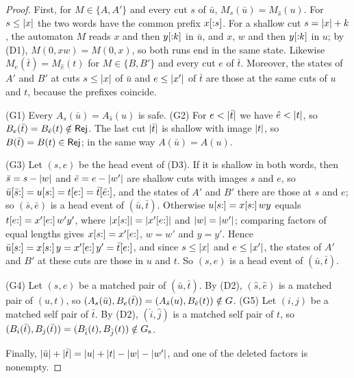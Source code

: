 \begin{proof}
First, for $M\in\{A,A'\}$ and every cut $s$ of $\bar u$, $M_s(\bar u)=M_{\hat
s}(u)$. For $s\le\lvert x\rvert$ the two words have the common prefix $x[{:}s]$. For a
shallow cut $s=\lvert x\rvert+k$, the automaton $M$ reads $x$ and then $y[{:}k]$ in
$\bar u$, and $x$, $w$ and then $y[{:}k]$ in $u$; by (D1),
$M(0,xw)=M(0,x)$, so both runs end in the same state. Likewise
$M_e(\bar t)=M_{\hat e}(t)$ for $M\in\{B,B'\}$ and every cut $e$ of $\bar t$.
Moreover, the states of $A'$ and $B'$ at cuts $s\le\lvert x\rvert$ of $\bar u$ and
$e\le\lvert x'\rvert$ of $\bar t$ are those at the same cuts of $u$ and $t$, because the
prefixes coincide.

(G1) Every $A_s(\bar u)=A_{\hat s}(u)$ is safe. (G2) For $e<\lvert \bar t\rvert$ we
have $\hat e<\lvert t\rvert$, so $B_e(\bar t)=B_{\hat e}(t)\notin\mathsf{Rej}$. The last cut
$\lvert \bar t\rvert$ is shallow with image $\lvert t\rvert$, so $B(\bar t)=B(t)\in\mathsf{Rej}$; in
the same way $A(\bar u)=A(u)$.

(G3) Let $(s,e)$ be the head event of (D3). If it is shallow in both words,
then $\bar s=s-\lvert w\rvert$ and $\bar e=e-\lvert w'\rvert$ are shallow cuts with images $s$
and $e$, so $\bar u[\bar s{:}]=u[s{:}]=t[e{:}]=\bar t[\bar e{:}]$, and
the states of $A'$ and $B'$ there are those at $s$ and $e$; so
$(\bar s,\bar e)$ is a head event of $(\bar u,\bar t)$. Otherwise
$u[s{:}]=x[s{:}]\,wy$ equals $t[e{:}]=x'[e{:}]\,w'y'$, where
$\lvert x[s{:}]\rvert=\lvert x'[e{:}]\rvert$ and $\lvert w\rvert=\lvert w'\rvert$; comparing factors of
equal lengths gives $x[s{:}]=x'[e{:}]$, $w=w'$ and $y=y'$. Hence
$\bar u[s{:}]=x[s{:}]\,y=x'[e{:}]\,y'=\bar t[e{:}]$, and since $s\le\lvert x\rvert$
and $e\le\lvert x'\rvert$, the states of $A'$ and $B'$ at these cuts are those in $u$
and $t$. So $(s,e)$ is a head event of $(\bar u,\bar t)$.

(G4) Let $(s,e)$ be a matched pair of $(\bar u,\bar t)$. By (D2), $(\hat s,\hat
e)$ is a matched pair of $(u,t)$, so
$(A_s(\bar u),B_e(\bar t))=(A_{\hat s}(u),B_{\hat e}(t))\notin G$. (G5) Let
$(i,j)$ be a matched self pair of $\bar t$. By (D2), $(\hat i,\hat j)$ is a
matched self pair of $t$, so $(B_i(\bar t),B_j(\bar t))=(B_{\hat
i}(t),B_{\hat j}(t))\notin G_{\mathrm{s}}$.

Finally, $\lvert \bar u\rvert+\lvert \bar t\rvert=\lvert u\rvert+\lvert t\rvert-\lvert w\rvert-\lvert w'\rvert$, and one of
the deleted factors is nonempty.
\end{proof}

